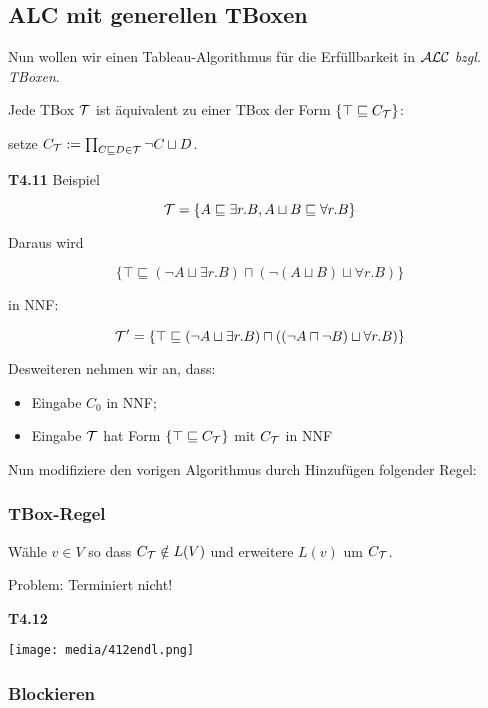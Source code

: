 \subsection{ALC mit generellen TBoxen}\label{alc-mit-generellen-tboxen}

Nun wollen wir einen Tableau-Algorithmus für die Erfüllbarkeit in $\mathcal{A}\mathcal{L}\mathcal{C}$  \emph{bzgl. TBoxen}.

Jede TBox $\mathcal{T}$ ist äquivalent zu einer TBox der Form
$\left\{ \top \sqsubseteq C_{\MT} \right\}$: 

\begin{center}setze $C_{\mathcal{T}} := \prod_{C \sqsubseteq D \in \mathcal{T}}^{}{\neg C \sqcup D}$.\end{center}

\textbf{T4.11} Beispiel

$$\mathcal{T} = \{A \sqsubseteq \exists r.B, A \sqcup B \sqsubseteq \forall r.B\}$$

Daraus wird

$$\{\top \sqsubseteq (\neg A \sqcup \exists r.B) \sqcap (\neg (A \sqcup B) \sqcup \forall r.B)\}$$

in NNF:

$$\mathcal{T}' = \{\top \sqsubseteq (\neg A \sqcup \exists r.B) \sqcap ((\neg A \sqcap \neg B) \sqcup \forall r.B)\}$$

Desweiteren nehmen wir an, dass:

\begin{itemize}
	\item Eingabe $C_0$ in NNF;
	\item Eingabe $\mathcal{T}$ hat Form $\{\top \sqsubseteq C_{\mathcal{T}}\}$ mit $C_{\mathcal{T}}$ in NNF
\end{itemize}

Nun modifiziere den vorigen Algorithmus durch Hinzufügen folgender Regel:

\subsubsection{TBox-Regel}\label{tbox-regel}

Wähle $v \in V$ so dass $C_{\MT} \notin L\left( V \right)$ und
erweitere $L\left( v \right)$ um $C_{\mathcal{T}}$.

Problem: Terminiert nicht!

\textbf{T4.12}

\texttt{[image: media/412endl.png]}

\subsubsection{Blockieren}\label{blockieren}

